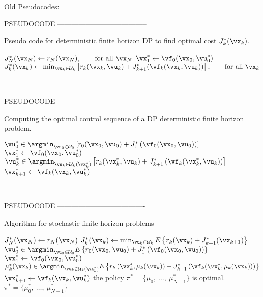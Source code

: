Old Pseudocodes:

PSEUDOCODE --------------------------------------
\begin{algorithm}
  \caption{Pseudo code for deterministic finite horizon DP to find optimal cost $J_k^*(\vx_k)$.}\label{alg:DPJs}
  \begin{algorithmic}
  \State $J^*_N(\vx_N) \gets r_N(\vx_N), \qquad \text{for all } \vx_N$
  \State $\vx_1^* \gets \vf_0(\vx_0,\vu_0^*)$
    \State $J^*_k(\vx_k) \gets \min_{\vu_k \in \mathcal{U}_k} \left[ r_k(\vx_k, \vu_k) + J^*_{k+1} (\vf_k(\vx_k,\vu_k))  \right], \qquad \text{for all } \vx_k$
  \EndFor
  \end{algorithmic}
  \end{algorithm}
---------------------------------------------------


PSEUDOCODE --------------------------------------
\begin{algorithm}
  \caption{Computing the optimal control sequence of a DP deterministic finite horizon problem.}\label{alg:OCSFH}

  \begin{algorithmic}
  \State $\vu_0^* \in \argmin_{\vu_0 \in \mathcal{U}_0} \left[ r_0(\vx_0,\vu_0) + J_1^*\left(\vf_0(\vx_0,\vu_0)\right) \right]$
  \State $\vx_1^* \gets \vf_0(\vx_0,\vu_0^*)$
  \State $\vu_k^* \in \argmin_{\vu_k \in \mathcal{U}_k(\vx_k^*)} \left[ r_k(\vx_k^*,\vu_k) + J_{k+1}^*\left(\vf_k(\vx_k^*,\vu_k)\right) \right]$
    \State $\vx_{k+1}^* \gets \vf_k(\vx_k,\vu_k^*)$
  \EndFor
  \end{algorithmic}
  \end{algorithm}
-------------------------------------------------

PSEUDOCODE -------------------------------------
\begin{algorithm}%
  \caption{Algorithm for stochastic finite horizon problems}\label{alg:SFH}

  \begin{algorithmic}
  \State $J^*_N(\vx_N) \gets r_N(\vx_N)$
     \State $J^*_k(\vx_k) \gets \min_{\vu_k \in \mathcal{U}_k} E\left\{ r_k(\vx_k) + J^*_{k+1}(\vx_{k+1})\right\}$
  \EndFor
      \State $\vu_0^* \in \argmin_{\vu_0 \in \mathcal{U}_0} E\left\{ r_0(\vx_0,\vu_0) + J_1^*\left(\vf_0(\vx_0,\vu_0)\right) \right\}$
      \State $\vx_1^* \gets \vf_0(\vx_0,\vu_0^*)$
  \State $\mu_k^*(\vx_k) \in \argmin_{\vu_k \in \mathcal{U}_k(\vx_k^*)} E\left\{ r_k\left(\vx_k^*,\mu_k(\vx_k)\right) + J_{k+1}^*\left(\vf_k(\vx_k^*,\mu_k(\vx_k))\right) \right\}$
    \State $\vx_{k+1}^* \gets \vf_k(\vx_k,\vu_k^*)$
  \EndFor
  \State the policy $\pi^* = \{\mu_0,\ \dots,\ \mu^*_{N-1} \}$ is optimal.
\Return $\pi^* = \{\mu_0^*,\ \dots,\ \mu^*_{N-1} \}$ 
\end{algorithmic}
\end{algorithm}


